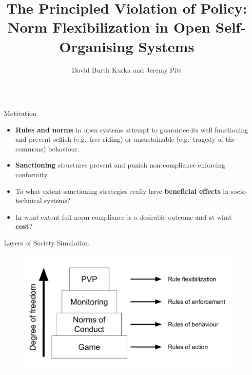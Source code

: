 \documentclass[xcolor={table}]{beamer}
\title{The Principled Violation of Policy: Norm Flexibilization in Open Self-Organising Systems}
\author{David Burth Kurka and Jeremy Pitt}
\institute{Department of Electrical and Electronic Engineering, Imperial College London}
\begin{document}
\begin{frame}[fragile=singleslide,t]\centering

\maketitle

\begin{columns}[T]

\begin{column}{.47\textwidth}

\begin{block}{Motivation}

\begin{itemize}

\item \textbf{Rules and norms} in open systems attempt to guarantee its well functioning and prevent selfish (e.g.\ free-riding) or unsustainable (e.g.\ tragedy of the commons) behaviour. 
\item \textbf{Sanctioning} structures prevent and punish non-compliance enforcing conformity.
%
\item To what extent sanctioning strategies really have \textbf{beneficial effects} in socio-technical systems?
\item In what extent full norm compliance is a desirable outcome and at what \textbf{cost}?
%
\end{itemize}

\end{block}


\begin{block}{Layers of Society Simulation}
\begin{figure}
  \centering
  \includegraphics[width=0.8\linewidth]{img/ruleslayers.pdf} 
  \label{fig:rules}
\end{figure}



\end{block}
\end{column}
\end{columns}
\end{frame}
\end{document}
